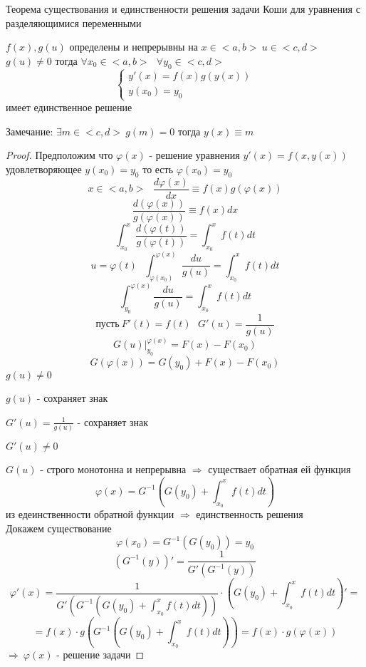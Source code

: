 \begin{title}[\Large]
  Теорема существования и единственности решения задачи Коши для уравнения с
  разделяющимися переменными
\end{title}

\begin{theorem}
  $f(x), g(u)$ определены и непрерывны на $x \in <a, b> ~ u \in <c, d>$
  $g(u) \not= 0$ тогда
  $\forall x_0 \in <a, b> ~~~ \forall y_0 \in <c, d>$
  $$
  \left\{
  \begin{array}{l}
    y'(x) = f(x) g(y(x)) \\
    y(x_0) = y_0
  \end{array}
  \right.
  $$
  имеет единственное решение

  Замечание: $\exists m \in <c, d> ~ g(m) = 0$ тогда $y(x) \equiv m$
\end{theorem}

\begin{proof}
  Предположим что $\varphi(x)$ - решение уравнения $y'(x) = f(x, y(x))$
  удовлетворяющее $y(x_0) = y_0$ то есть $\varphi(x_0) = y_0$
  $$
  x \in <a, b> ~~~ \frac{d\varphi(x)}{dx} \equiv f(x)g(\varphi(x))
  $$
  $$
  \frac{d(\varphi(x))}{g(\varphi(x))} \equiv f(x)dx
  $$
  $$
  \int_{x_0}^x \frac{d(\varphi(t))}{g(\varphi(t))} = \int_{x_0}^x f(t)dt
  $$
  $$
  u = \varphi(t) ~~~ \int_{\varphi(x_0)}^{\varphi(x)} \frac{du}{g(u)} =
  \int_{x_0}^x f(t)dt
  $$
  $$
  \int_{y_0}^{\varphi(x)} \frac{du}{g(u)} = \int_{x_0}^x f(t)dt
  $$
  $$
  \text{пусть} ~ F'(t) = f(t) ~~~ G'(u) = \frac{1}{g(u)}
  $$
  $$
  G(u) |_{y_0}^{\varphi(x)} = F(x) - F(x_0)
  $$
  $$
  G(\varphi(x)) = G(y_0) + F(x) - F(x_0)
  $$
  $g(u) \not= 0$

  $g(u)$ - сохраняет знак

  $G'(u) = \frac{1}{g(u)}$ - сохраняет знак

  $G'(u) \not= 0$

  $G(u)$ - строго монотонна и непрерывна $\Rightarrow$
  существает обратная ей функция
  $$
  \varphi(x) = G^{-1} \left( G(y_0) + \int_{x_0}^x f(t)dt \right)
  $$
  из едеинственности обратной функции $\Rightarrow$ единственность решения \\

  Докажем существование
  $$
  \varphi(x_0) = G^{-1}(G(y_0)) = y_0
  $$
  $$
  (G^{-1}(y))' = \frac{1}{G'(G^{-1}(y))}
  $$
  $$
  \varphi'(x) = \frac{1}{G' \left( G^{-1} \left( G(y_0)
  + \int_{x_0}^x f(t)dt \right) \right)} \cdot
  \left( G(y_0) + \int_{x_0}^x f(t)dt \right)' =
  $$
  $$
  = f(x) \cdot g \left( G^{-1} \left( G(y_0) +
  \int_{x_0}^x f(t)dt \right) \right) = f(x) \cdot g(\varphi(x))
  $$
  $\Rightarrow ~ \varphi(x)$ - решение задачи
\end{proof}

